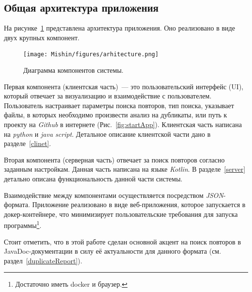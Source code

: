 

\subsection{Общая архитектура приложения}
На рисунке~\ref{fig:application} представлена архитектура приложения.
Оно реализовано в виде двух крупных компонент.

\begin{figure}[H]
    \texttt{[image: Mishin/figures/arhitecture.png]}
    \caption{Диаграмма компонентов системы.}\label{fig:application}
\end{figure}


Первая компонента (клиентская часть)~--- это пользовательский интерфейс ({UI}), который  отвечает за визуализацию и взаимодействие с пользователем.
Пользователь настраивает параметры поиска повторов, тип поиска, указывает файлы, в которых необходимо произвести анализ на дубликаты, или путь к проекту на \emph{Github} в интернете (Рис.~\ref{fig:startApp}).
Клиентская часть написана на \emph{python} и \emph{java script}.
Детальное описание клиентской части дано в разделе~\ref{clinet}.

Вторая компонента (серверная часть) отвечает за поиск повторов согласно заданным настройкам.
Данная часть написана на языке \emph{Kotlin}.
В разделе~\ref{server} детально описана функциональность данной части системы.

Взаимодействие между компонентами осуществляется посредством \emph{JSON}-формата.
Приложение реализовано в виде веб-приложения, которое запускается в докер-контейнере, что минимизирует пользовательские требования для запуска программы\footnote{Достаточно иметь docker и браузер.}.




Стоит отметить, что в этой работе сделан основной акцент на поиск повторов в JavaDoc-документации в силу её актуальности для данного формата (см. раздел~\ref{duplicateReport}).

